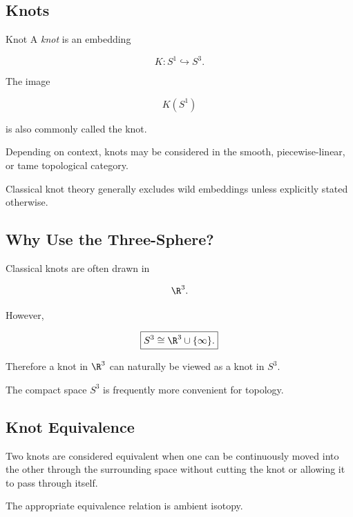 \subsection{Knots}
\label{subsec:mathematical-knots}

\begin{definitionbox}{Knot}
A \emph{knot} is an embedding

\[
\boxed{
K:S^1\hookrightarrow S^3.
}
\]

The image

\[
K(S^1)
\]

is also commonly called the knot.
\end{definitionbox}

Depending on context, knots may be considered in the smooth, piecewise-linear,
or tame topological category.

Classical knot theory generally excludes wild embeddings unless explicitly
stated otherwise.

\subsection{Why Use the Three-Sphere?}
\label{subsec:why-three-sphere-knots}

Classical knots are often drawn in

\[
\R^3.
\]

However,

\[
\boxed{
S^3\cong\R^3\cup\{\infty\}.
}
\]

Therefore a knot in \(\R^3\) can naturally be viewed as a knot in \(S^3\).

The compact space \(S^3\) is frequently more convenient for topology.

\subsection{Knot Equivalence}
\label{subsec:knot-equivalence}

Two knots are considered equivalent when one can be continuously moved into
the other through the surrounding space without cutting the knot or allowing
it to pass through itself.

The appropriate equivalence relation is ambient isotopy.

